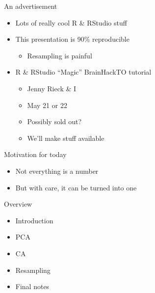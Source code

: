 \documentclass[
  ignorenonframetext,
]{beamer}
\providecommand{\tightlist}{%
  \setlength{\itemsep}{0pt}\setlength{\parskip}{0pt}}
\begin{document}
\begin{frame}{An advertisement}
\protect\hypertarget{an-advertisement}{}

\begin{itemize}[<+->]
\tightlist
\item
  Lots of really cool R \& RStudio stuff
\item
  This presentation is 90\% reproducible

  \begin{itemize}[<+->]
  \tightlist
  \item
    Resampling is painful
  \end{itemize}
\item
  R \& RStudio ``Magic'' BrainHackTO tutorial

  \begin{itemize}[<+->]
  \tightlist
  \item
    Jenny Rieck \& I
  \item
    May 21 or 22
  \item
    Possibly sold out?
  \item
    We'll make stuff available
  \end{itemize}
\end{itemize}

\end{frame}

\begin{frame}{Motivation for today}
\protect\hypertarget{motivation-for-today}{}

\begin{itemize}[<+->]
\tightlist
\item
  Not everything is a number
\item
  But with care, it can be turned into one
\end{itemize}

\end{frame}

\begin{frame}{Overview}
\protect\hypertarget{overview}{}

\begin{itemize}[<+->]
\tightlist
\item
  Introduction
\item
  PCA
\item
  CA
\item
  Resampling
\item
  Final notes
\end{itemize}

\end{frame}
\end{document}
